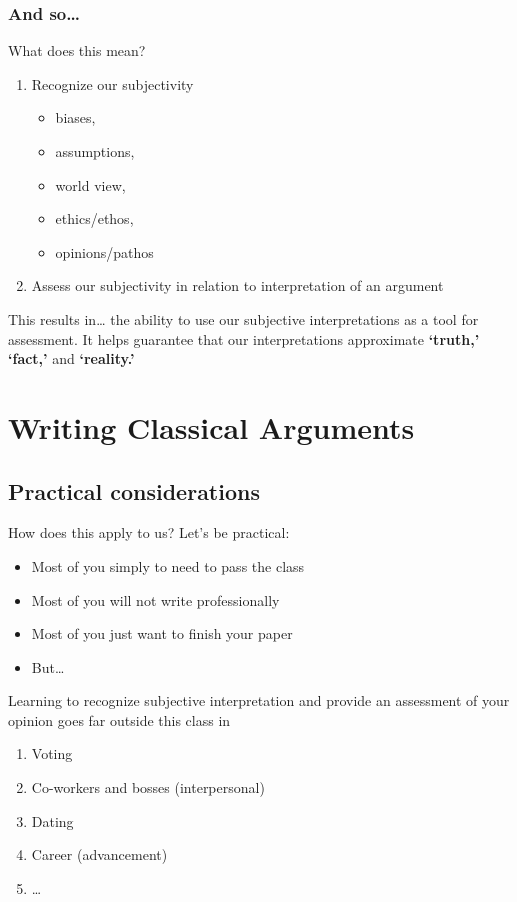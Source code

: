 \documentclass{beamer}
\begin{document}
\subsubsection{And so\dots}
\begin{frame}{What does this mean?}
\begin{enumerate}
\item Recognize our subjectivity \begin{itemize} \item biases, \item assumptions, \item world view, \item ethics/ethos, \item opinions/pathos
\end{itemize}
\item Assess our subjectivity in relation to interpretation of an argument
\end{enumerate}
\begin{exampleblock}{This results in\dots}
\pause
the ability to use our subjective interpretations as a tool for assessment. It helps guarantee that our interpretations approximate {\bf `truth,' `fact,'} and {\bf `reality.'} 
\end{exampleblock}
\end{frame}


\section{Writing Classical Arguments}

\subsection{Practical considerations}
\begin{frame}{How does this apply to us?}
Let's be practical:\pause
\begin{itemize}[<+-| alert@+>]
\item Most of you simply to need to pass the class
\item Most of you will not write professionally
\item Most of you just want to finish your paper
\item But\dots
\end{itemize}
\pause Learning to recognize subjective interpretation and provide an assessment of your opinion goes far outside this class in\pause
\begin{enumerate}
\item<+-> Voting
\item<+-> Co-workers and bosses (interpersonal)
\item<+-> Dating
\item<+-> Career (advancement)
\item<+-> \ldots
\end{enumerate}
\end{frame}\label{Application}
\end{document}
